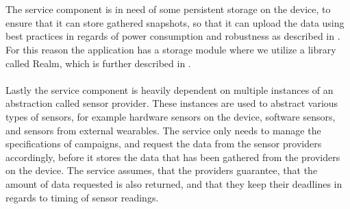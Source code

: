 \\\\
The service component is in need of some persistent storage on the device, to ensure that it can store gathered snapshots, so that it can upload the data using best practices in regards of power consumption and robustness as described in . For this reason the application has a storage module where we utilize a library called Realm, which is further described in .
\\\\
Lastly the service component is heavily dependent on multiple instances of an abstraction called sensor provider. These instances are used to abstract various types of sensors, for example hardware sensors on the device, software sensors, and sensors from external wearables. The service only needs to manage the specifications of campaigns, and request the data from the sensor providers accordingly, before it stores the data that has been gathered from the providers on the device. The service assumes, that the providers guarantee, that the amount of data requested is also returned, and that they keep their deadlines in regards to timing of sensor readings.




